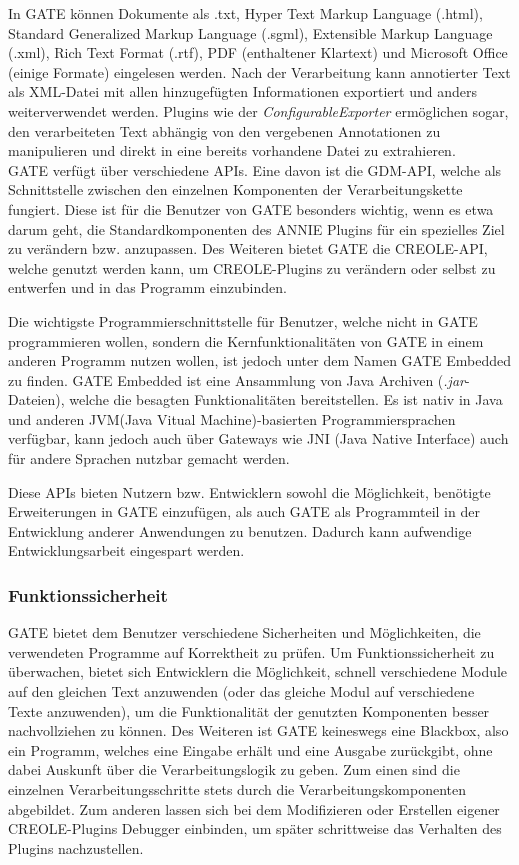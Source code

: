 \documentclass[12pt]{report}
\begin{document}
In GATE können Dokumente als .txt, Hyper Text Markup Language (.html), Standard Generalized Markup Language (.sgml), Extensible Markup Language (.xml), Rich Text Format (.rtf), PDF (enthaltener Klartext) und Microsoft Office (einige Formate) eingelesen werden.
Nach der Verarbeitung kann annotierter Text als XML-Datei mit allen hinzugefügten Informationen exportiert und anders weiterverwendet werden. Plugins wie der \textit{ConfigurableExporter} ermöglichen sogar, den verarbeiteten Text abhängig von den vergebenen Annotationen zu manipulieren und direkt in eine bereits vorhandene Datei zu extrahieren.\\

GATE verfügt über verschiedene APIs. Eine davon ist die GDM-API, welche als Schnittstelle zwischen den einzelnen Komponenten der Verarbeitungskette fungiert. Diese ist für die Benutzer von GATE besonders wichtig, wenn es etwa darum geht, die Standardkomponenten des ANNIE Plugins für ein spezielles Ziel zu verändern bzw. anzupassen. Des Weiteren bietet GATE die CREOLE-API, welche genutzt werden kann, um CREOLE-Plugins zu verändern oder selbst zu entwerfen und in das Programm einzubinden.

Die wichtigste Programmierschnittstelle für Benutzer, welche nicht in GATE programmieren wollen, sondern die Kernfunktionalitäten von GATE in einem anderen Programm nutzen wollen, ist jedoch unter dem Namen GATE Embedded zu finden. GATE Embedded ist eine Ansammlung von Java Archiven (\textit{.jar}-Dateien), welche die besagten Funktionalitäten bereitstellen. Es ist nativ in Java und anderen JVM(Java Vitual Machine)-basierten Programmiersprachen verfügbar, kann jedoch auch über Gateways wie JNI (Java Native Interface) auch für andere Sprachen nutzbar gemacht werden.

Diese APIs bieten Nutzern bzw. Entwicklern sowohl die Möglichkeit, benötigte Erweiterungen in GATE einzufügen, als auch GATE als Programmteil in der Entwicklung anderer Anwendungen zu benutzen. Dadurch kann aufwendige Entwicklungsarbeit eingespart werden. 

\subsubsection{Funktionssicherheit}
GATE bietet dem Benutzer verschiedene Sicherheiten und Möglichkeiten, die verwendeten Programme auf Korrektheit zu prüfen. 
Um Funktionssicherheit zu überwachen, bietet sich Entwicklern die Möglichkeit, schnell verschiedene Module auf den gleichen Text anzuwenden (oder das gleiche Modul auf verschiedene Texte anzuwenden), um die Funktionalität der genutzten Komponenten besser nachvollziehen zu können. Des Weiteren ist GATE keineswegs eine Blackbox, also ein Programm, welches eine Eingabe erhält und eine Ausgabe zurückgibt, ohne dabei Auskunft über die Verarbeitungslogik zu geben. Zum einen sind die einzelnen Verarbeitungsschritte stets durch die Verarbeitungskomponenten abgebildet. Zum anderen lassen sich bei dem Modifizieren oder Erstellen eigener CREOLE-Plugins Debugger einbinden, um später schrittweise das Verhalten des Plugins nachzustellen.
\end{document}

